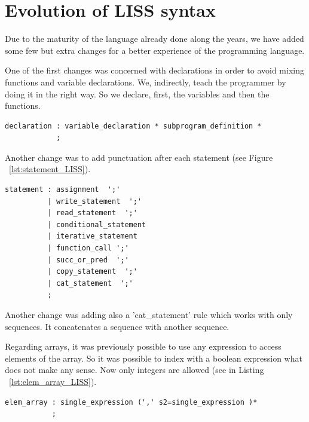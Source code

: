 \documentclass[
  oneside,
  11pt, a4paper,
  footinclude=true,
  headinclude=true,
  cleardoublepage=empty
]{scrbook}
\begin{document}
\section{Evolution of LISS syntax}
Due to the maturity of the language already done along the years, we have added some few but extra changes for a better experience of the programming language.


One of the first changes was concerned with declarations in order to avoid mixing functions and variable declarations.
We, indirectly, teach the programmer by doing it in the right way. So we declare, first, the variables and then the functions.
\begin{lstlisting}[caption={},label={lst:declaration_LISS}]
declaration : variable_declaration * subprogram_definition *
            ;
\end{lstlisting}

Another change was to add punctuation after each statement (see Figure ~\ref{lst:statement_LISS}).
\begin{lstlisting}[caption={Function statement},label={lst:statement_LISS}]
statement : assignment  ';'
          | write_statement  ';'
          | read_statement  ';'
          | conditional_statement
          | iterative_statement
          | function_call ';'
          | succ_or_pred  ';'
          | copy_statement  ';'
          | cat_statement  ';'
          ;
\end{lstlisting}

Another change was adding also a 'cat\_statement' rule which works with only sequences. It concatenates a sequence with another sequence.

Regarding arrays, it was previously possible to use any expression to access elements of the array. So it was possible to index with a boolean expression what does not make any sense.
Now only integers are allowed (see in Listing ~\ref{lst:elem_array_LISS}).


\begin{lstlisting}[caption={Rule element of array},label={lst:elem_array_LISS}]
elem_array : single_expression (',' s2=single_expression )*
           ;
\end{lstlisting}
\end{document}
